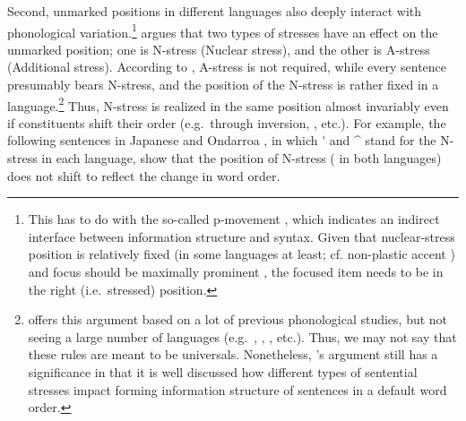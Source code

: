 Second, unmarked  positions in different languages also deeply
interact with phonological variation.\footnote{This has to do with the
  so-called p-movement \citep{zubizarreta:98}, which indicates an
  indirect interface between information structure and syntax. Given
  that nuclear-stress position is relatively fixed (in some languages
  at least; cf. non-plastic accent \citep{vallduvi:90}) and focus
  should be maximally prominent \citep{buring:10}, the focused item
  needs to be in the right (i.e.\ stressed) position.}
\citet{ishihara:01} argues that two types of stresses have an effect
on the unmarked position; one is N-stress (Nuclear stress), and the
other is A-stress (Additional stress). According to
\citeauthor{ishihara:01}, A-stress is not required, while every
sentence presumably bears N-stress, and the position of the N-stress
is rather fixed in a language.\footnote{\citet{ishihara:01} offers
  this argument based on a lot of previous phonological studies, but
  not seeing a large number of languages (e.g.\ ,
  , , etc.). Thus, we may not say that these
  rules are meant to be universals. Nonetheless,
  \citeauthor{ishihara:01}'s argument still has a significance in that
  it is well discussed how different types of sentential stresses
  impact forming information structure of sentences in a default word
  order.}  Thus, N-stress is realized in the same position almost
invariably even if constituents shift their order (e.g.\ through
inversion, , etc.). For example, the following
sentences in Japanese  and Ondarroa
 , in which \'{\xspace} and
\^{\xspace} stand for the N-stress in each language, show that the
position of N-stress ( in both languages) does not
shift to reflect the change in word order.






